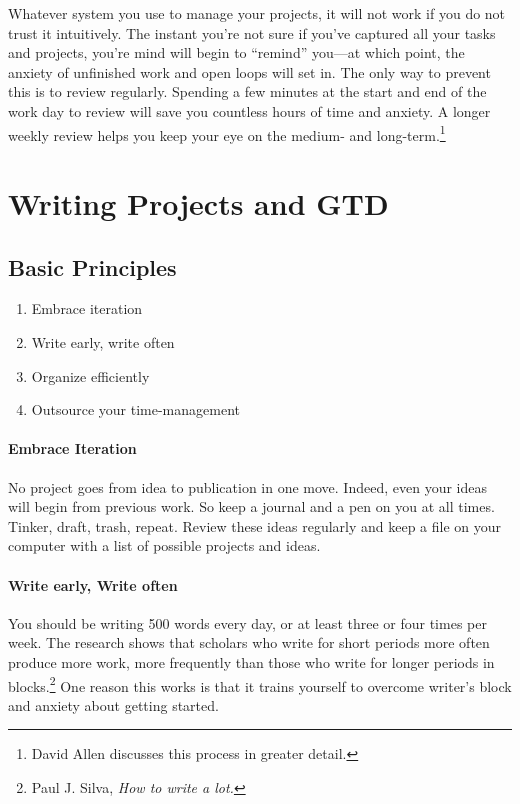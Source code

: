 \documentclass{tufte-handout}
\begin{document}
Whatever system you use to manage your projects, it will not work if
you do not trust it intuitively. The instant you're not sure if you've
captured all your tasks and projects, you're mind will begin to
``remind'' you---at which point, the anxiety of unfinished work and
open loops will set in. The only way to prevent this is to review
regularly. Spending a few minutes at the start and end of the work day
to review will save you countless hours of time and anxiety. A longer
weekly review helps you keep your eye on the medium- and
long-term.\footnote{David Allen discusses this process in greater
  detail.}



\section{Writing Projects and GTD}
\label{sec:write-proj-gtd}

\subsection{Basic Principles}
\label{basic-principles}

\begin{enumerate}

  \item Embrace iteration
  \item Write early, write often
  \item Organize efficiently
  \item Outsource your time-management

  \end{enumerate}

\paragraph{Embrace Iteration} No project goes from idea to publication
in one move. Indeed, even your ideas will begin from previous work. So
keep a journal and a pen on you at all times. Tinker, draft, trash,
repeat. Review these ideas regularly and keep a file on your computer
with a list of possible projects and ideas.

\paragraph{Write early, Write often} You should be writing 500 words
every day, or at least three or four times per week. The research
shows that scholars who write for short periods more often produce
more work, more frequently than those who write for longer periods in
blocks.\footnote{Paul J. Silva, \textit{How to write a lot.}} One
  reason this works is that it trains yourself to overcome writer's
  block and anxiety about getting started.
\end{document}
